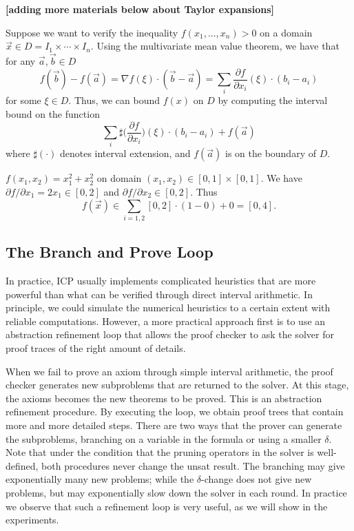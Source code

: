 \documentclass[12pt]{article}
\begin{document}
{\bf[adding more materials below about Taylor expansions]}

Suppose we want to verify the inequality $f(x_1,...,x_n) > 0$ on a domain $\vec x\in D = I_1\times \cdots \times I_n.$ Using the multivariate mean value theorem, we have that for any $\vec a, \vec b\in D$
$$f(\vec b) - f(\vec a) = \nabla f(\xi)\cdot (\vec b - \vec a) = \sum_i \frac{\partial f}{\partial x_i}(\xi)\cdot (b_i-a_i)$$
for some $\xi\in D$. Thus, we can bound $f(x)$ on $D$ by computing the interval bound on the function
$$\sum_i \sharp\bigg(\frac{\partial f}{\partial x_i}\bigg)(\xi)\cdot (b_i-a_i) + f(\vec a)$$
where $\sharp(\cdot)$ denotes interval extension, and $f(\vec a)$ is on the boundary of $D$.

\begin{example}
$f(x_1, x_2) = x_1^2 + x_2^2$ on domain $(x_1,x_2)\in [0,1]\times[0,1]$. We have $\partial f/\partial x_1 = 2x_1\in [0,2]$ and $\partial f/\partial x_2\in [0,2]$. Thus
$$f(\vec x)\in \sum_{i=1,2} [0,2]\cdot (1-0) + 0 = [0,4].$$
\end{example}


\subsection{The Branch and Prove Loop}

In practice, ICP usually implements complicated heuristics that are more
powerful than what can be verified through direct interval arithmetic. In
principle, we could simulate the numerical heuristics to a certain extent with
reliable computations. However, a more practical approach first is to use an
abstraction refinement loop that allows the proof checker to ask the
solver for proof traces of the right amount of details.

When we fail to prove an axiom through simple interval arithmetic, the proof
checker generates new subproblems that are returned to the solver. At this
stage, the axioms becomes the new theorems to be proved.
This is an abstraction refinement procedure. By executing the loop, we obtain
proof trees that contain more and more detailed steps. There are two ways that
the prover can generate the subproblems, branching on a variable in the
formula or using a smaller $\delta$. Note that under the condition that
the pruning operators in the solver is well-defined, both procedures never
change the {\sf unsat} result. The branching may give
exponentially many new problems; while the $\delta$-change does not give new
problems, but may exponentially slow down the solver in each round. In practice
we observe that such a refinement loop is very useful, as we will show in the
experiments.
\end{document}
